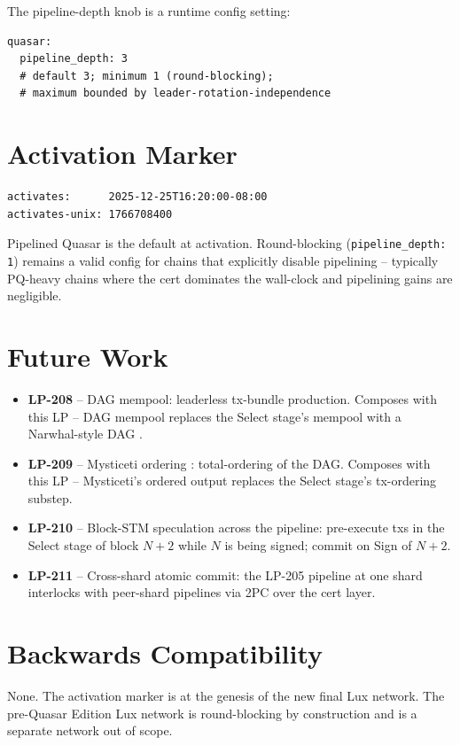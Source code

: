 The pipeline-depth knob is a runtime config setting:

\begin{verbatim}
quasar:
  pipeline_depth: 3
  # default 3; minimum 1 (round-blocking);
  # maximum bounded by leader-rotation-independence
\end{verbatim}

\section{Activation Marker}

\begin{verbatim}
activates:      2025-12-25T16:20:00-08:00
activates-unix: 1766708400
\end{verbatim}

Pipelined Quasar is the default at activation. Round-blocking
(\texttt{pipeline\_depth: 1}) remains a valid config for chains that
explicitly disable pipelining -- typically PQ-heavy chains where the
cert dominates the wall-clock and pipelining gains are negligible.

\section{Future Work}

\begin{itemize}[leftmargin=2em,nosep]
\item \textbf{LP-208} -- DAG mempool: leaderless tx-bundle production.
  Composes with this LP -- DAG mempool replaces the Select stage's
  mempool with a Narwhal-style DAG \cite{narwhal2022}.
\item \textbf{LP-209} -- Mysticeti ordering \cite{mysticeti2024}:
  total-ordering of the DAG. Composes with this LP -- Mysticeti's
  ordered output replaces the Select stage's tx-ordering substep.
\item \textbf{LP-210} -- Block-STM speculation across the pipeline:
  pre-execute txs in the Select stage of block $N{+}2$ while $N$ is
  being signed; commit on Sign of $N{+}2$.
\item \textbf{LP-211} -- Cross-shard atomic commit: the LP-205
  pipeline at one shard interlocks with peer-shard pipelines via 2PC
  over the cert layer.
\end{itemize}

\section{Backwards Compatibility}

None. The activation marker is at the genesis of the new final Lux
network. The pre-Quasar Edition Lux network is round-blocking by
construction and is a separate network out of scope.
